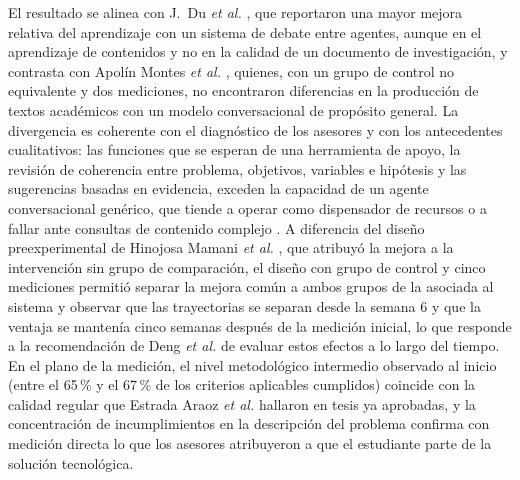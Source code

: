 \documentclass[journal]{IEEEtran}
\begin{document}
El resultado se alinea con J.\ Du \emph{et al.} \cite{duj2025}, que reportaron una mayor mejora relativa del aprendizaje con un sistema de debate entre agentes, aunque en el aprendizaje de contenidos y no en la calidad de un documento de investigación, y contrasta con Apolín Montes \emph{et al.} \cite{apolin2024}, quienes, con un grupo de control no equivalente y dos mediciones, no encontraron diferencias en la producción de textos académicos con un modelo conversacional de propósito general. La divergencia es coherente con el diagnóstico de los asesores y con los antecedentes cualitativos: las funciones que se esperan de una herramienta de apoyo, la revisión de coherencia entre problema, objetivos, variables e hipótesis y las sugerencias basadas en evidencia, exceden la capacidad de un agente conversacional genérico, que tiende a operar como dispensador de recursos \cite{ortega2021} o a fallar ante consultas de contenido complejo \cite{arredondo2020}. A diferencia del diseño preexperimental de Hinojosa Mamani \emph{et al.} \cite{hinojosa2024}, que atribuyó la mejora a la intervención sin grupo de comparación, el diseño con grupo de control y cinco mediciones permitió separar la mejora común a ambos grupos de la asociada al sistema y observar que las trayectorias se separan desde la semana 6 y que la ventaja se mantenía cinco semanas después de la medición inicial, lo que responde a la recomendación de Deng \emph{et al.} \cite{deng2025} de evaluar estos efectos a lo largo del tiempo. En el plano de la medición, el nivel metodológico intermedio observado al inicio (entre el 65\,\% y el 67\,\% de los criterios aplicables cumplidos) coincide con la calidad regular que Estrada Araoz \emph{et al.} \cite{estrada2022} hallaron en tesis ya aprobadas, y la concentración de incumplimientos en la descripción del problema confirma con medición directa lo que los asesores atribuyeron a que el estudiante parte de la solución tecnológica.
\end{document}
